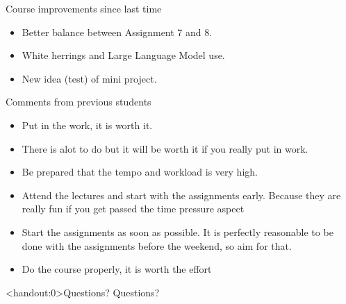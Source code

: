 \documentclass[10pt]{beamer}
\begin{document}
\begin{frame}{Course improvements since last time}


\begin{itemize}
  \item Better balance between Assignment 7 and 8.
  \item White herrings and Large Language Model use.
  \item New idea (test) of mini project.
\end{itemize}

\end{frame}


\frame{\sectionpage}

\begin{frame}{Comments from previous students}

\begin{itemize}
\item Put in the work, it is worth it. \pause
\item There is alot to do but it will be worth it if you really put in work. \pause
\item Be prepared that the tempo and workload is very high. \pause
\item Attend the lectures and start with the assignments early. Because they are really fun
if you get passed the time pressure aspect \pause
\item Start the assignments as soon as possible. It is perfectly reasonable to be done with
the assignments before the weekend, so aim for that. \pause
\item Do the course properly, it is worth the effort
\end{itemize}

\end{frame}


\begin{frame}<handout:0>{Questions?}
Questions?
\end{frame}

\end{document}
